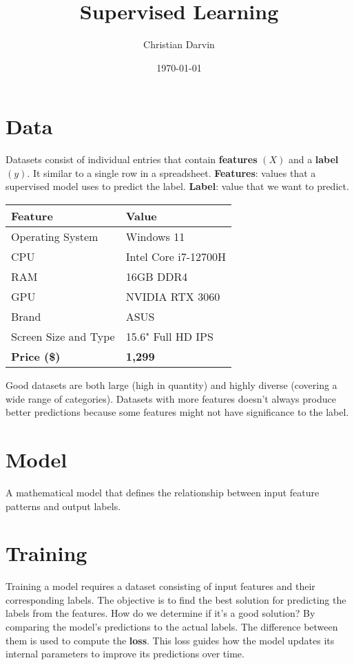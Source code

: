 \documentclass[a4paper,12pt]{article}
\title{Supervised Learning}
\author{Christian Darvin}
\date{\today}
\begin{document}
\maketitle
\tableofcontents
\newpage

\section{Data}
Datasets consist of individual entries that contain \textbf{features} $(X)$ and a \textbf{label} $(y)$. It similar to a single row in a spreadsheet. \newline
\textbf{Features}: values that a supervised model uses to predict the label. \newline
\textbf{Label}: value that we want to predict. \newline

\begin{center}
\begin{tabularx}{\textwidth}{@{}lX@{}}
\toprule
\textbf{Feature} & \textbf{Value} \\
\midrule
Operating System & Windows 11 \\
CPU & Intel Core i7-12700H \\
RAM & 16GB DDR4 \\
GPU & NVIDIA RTX 3060 \\
Brand & ASUS \\
Screen Size and Type & 15.6" Full HD IPS \\
\textbf{Price (\$)} & \textbf{1,299} \\
\bottomrule
\end{tabularx}
\end{center}

\noindent Good datasets are both large (high in quantity) and highly diverse (covering a wide range of categories). Datasets with more features doesn't always produce better predictions because some features might not have significance to the label.

\section{Model}
A mathematical model that defines the relationship between input feature patterns and output labels.

\section{Training}
Training a model requires a dataset consisting of input features and their corresponding labels. The objective is to find the best solution for predicting the labels from the features. How do we determine if it's a good solution? By comparing the model's predictions to the actual labels. The difference between them is used to compute the \textbf{loss}. This loss guides how the model updates its internal parameters to improve its predictions over time. \newline
\end{document}
